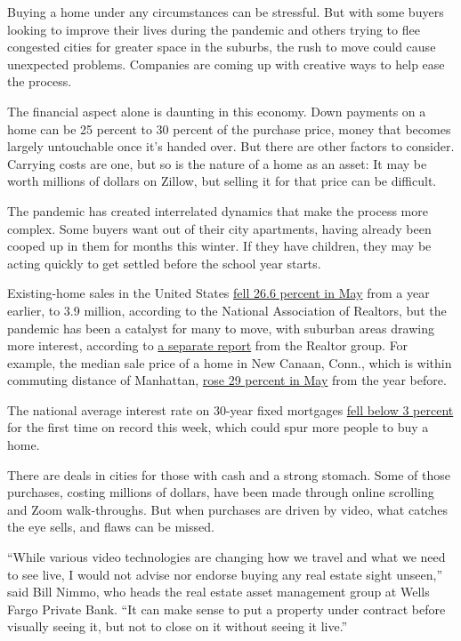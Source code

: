 Buying a home under any circumstances can be stressful. But with some
buyers looking to improve their lives during the pandemic and others
trying to flee congested cities for greater space in the suburbs, the
rush to move could cause unexpected problems. Companies are coming up
with creative ways to help ease the process.

The financial aspect alone is daunting in this economy. Down payments on
a home can be 25 percent to 30 percent of the purchase price, money that
becomes largely untouchable once it's handed over. But there are other
factors to consider. Carrying costs are one, but so is the nature of a
home as an asset: It may be worth millions of dollars on Zillow, but
selling it for that price can be difficult.

The pandemic has created interrelated dynamics that make the process
more complex. Some buyers want out of their city apartments, having
already been cooped up in them for months this winter. If they have
children, they may be acting quickly to get settled before the school
year starts.

Existing-home sales in the United States
\href{https://www.nar.realtor/newsroom/existing-home-sales-fall-9-7-in-may-while-nar-expects-strong-rebound-in-coming-months}{fell
26.6 percent in May} from a year earlier, to 3.9 million, according to
the National Association of Realtors, but the pandemic has been a
catalyst for many to move, with suburban areas drawing more interest,
according to
\href{https://www.nar.realtor/sites/default/files/documents/2020-market-recovery-survey-07-09-2020.pdf}{a
separate report} from the Realtor group. For example, the median sale
price of a home in New Canaan, Conn., which is within commuting distance
of Manhattan,
\href{https://newcanaanite.com/new-canaan-home-sales-median-price-up-29-in-may-3046583}{rose
29 percent in May} from the year before.

The national average interest rate on 30-year fixed mortgages
\href{https://www.nytimes.com/2020/07/16/business/mortgage-rates-below-3-percent.html}{fell
below 3 percent} for the first time on record this week, which could
spur more people to buy a home.

There are deals in cities for those with cash and a strong stomach. Some
of those purchases, costing millions of dollars, have been made through
online scrolling and Zoom walk-throughs. But when purchases are driven
by video, what catches the eye sells, and flaws can be missed.

``While various video technologies are changing how we travel and what
we need to see live, I would not advise nor endorse buying any real
estate sight unseen,'' said Bill Nimmo, who heads the real estate asset
management group at Wells Fargo Private Bank. ``It can make sense to put
a property under contract before visually seeing it, but not to close on
it without seeing it live.''

